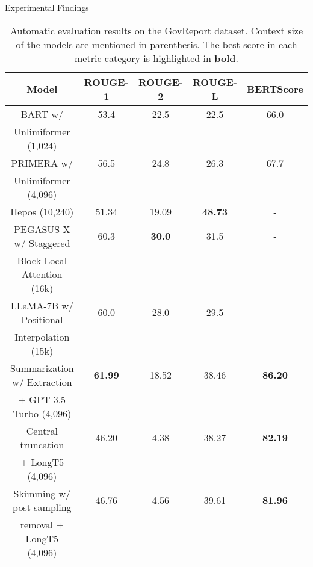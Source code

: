 \begin{frame}{Experimental Findings}

	\begin{table}[!ht]
		\centering
		\tiny
	
		\begin{tabular}{c c c c c}
			\hline
			Model & ROUGE-1 & ROUGE-2 & ROUGE-L & BERTScore \\
			\hline
			BART w/ & 53.4 & 22.5 & 22.5 & 66.0 \\
			Unlimiformer (1,024) & & & & \\
			PRIMERA w/ & 56.5 & 24.8 & 26.3 & 67.7 \\
			Unlimiformer (4,096) & & & & \\
			Hepos (10,240) & 51.34 & 19.09 & \textbf{48.73} & - \\
			PEGASUS-X w/ Staggered & 60.3 & \textbf{30.0} & 31.5 & - \\
			Block-Local Attention (16k) & & & & \\
			LLaMA-7B w/ Positional & 60.0 & 28.0 & 29.5 & - \\
			Interpolation (15k) & & & & \\
			\hline
			Summarization w/ Extraction & \textbf{61.99} & 18.52 & 38.46 & \textbf{86.20} \\
			+ GPT-3.5 Turbo (4,096) & & & & \\
			Central truncation & 46.20 & 4.38 & 38.27 & \textbf{82.19} \\
			+ LongT5 (4,096) & & & & \\
			Skimming w/ post-sampling & 46.76 & 4.56 & 39.61 & \textbf{81.96} \\
			removal + LongT5 (4,096) & & & & \\
			\hline
		\end{tabular}
	
		\caption{Automatic evaluation results on the GovReport dataset. Context size of
		the models are mentioned in parenthesis. The best score in each metric category
		is highlighted in \textbf{bold}.}
	\end{table}
	
\end{frame}
